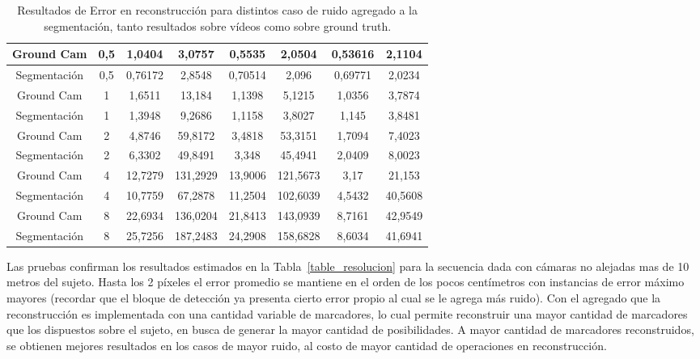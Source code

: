 \begin{table}[ht!]
{\begin{tabular}{cc|c|c|c|c|c|c|}
\multicolumn{1}{|c|}{Ground Cam} & 0,5 & 1,0404 & 3,0757 & 0,5535 & 2,0504 & 0,53616 & 2,1104 \\ \hline
\multicolumn{1}{|c|}{Segmentación} & 0,5 & 0,76172 & 2,8548 & 0,70514 & 2,096 & 0,69771 & 2,0234 \\ \hline
\multicolumn{1}{|c|}{Ground Cam} & 1 & 1,6511 & 13,184 & 1,1398 & 5,1215 & 1,0356 & 3,7874 \\ \hline
\multicolumn{1}{|c|}{Segmentación} & 1 & 1,3948 & 9,2686 & 1,1158 & 3,8027 & 1,145 & 3,8481 \\ \hline
\multicolumn{1}{|c|}{Ground Cam} & 2 & 4,8746 & 59,8172 & 3,4818 & 53,3151 & 1,7094 & 7,4023 \\ \hline
\multicolumn{1}{|c|}{Segmentación} & 2 & 6,3302 & 49,8491 & 3,348 & 45,4941 & 2,0409 & 8,0023 \\ \hline
\multicolumn{1}{|c|}{Ground Cam} & 4 & 12,7279 & 131,2929 & 13,9006 & 121,5673 & 3,17 & 21,153 \\ \hline
\multicolumn{1}{|c|}{Segmentación} & 4 & 10,7759 & 67,2878 & 11,2504 & 102,6039 & 4,5432 & 40,5608 \\ \hline
\multicolumn{1}{|c|}{Ground Cam} & 8 & 22,6934 & 136,0204 & 21,8413 & 143,0939 & 8,7161 & 42,9549 \\ \hline
\multicolumn{1}{|c|}{Segmentación} & 8 & 25,7256 & 187,2483 & 24,2908 & 158,6828 & 8,6034 & 41,6941 \\ \hline
\end{tabular}
}
\caption{Resultados de Error en reconstrucción para distintos caso de ruido agregado a la segmentación, tanto resultados sobre vídeos como sobre ground truth.}
\end{table}

Las pruebas confirman los resultados estimados en la Tabla~\ref{table_resolucion} para la secuencia dada con cámaras no alejadas mas de 10 metros del sujeto. Hasta los 2 píxeles el error promedio se mantiene en el orden de los pocos centímetros con instancias de error máximo mayores (recordar que el bloque de detección ya presenta cierto error propio al cual se le agrega más ruido). Con el agregado que la reconstrucción es implementada con una cantidad variable de marcadores, lo cual permite reconstruir una mayor cantidad de marcadores que los dispuestos sobre el sujeto, en busca de generar la mayor cantidad de posibilidades. A mayor cantidad de marcadores reconstruidos, se obtienen mejores resultados en los casos de mayor ruido, al costo de mayor cantidad de operaciones en reconstrucción.

